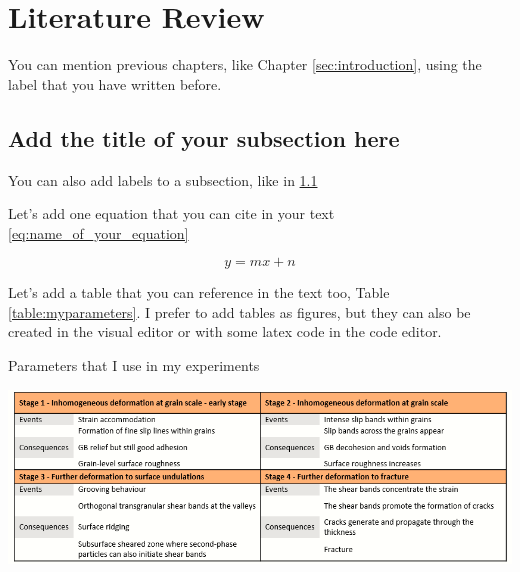 \section{Literature Review}
\label{sec:litreview}

You can mention previous chapters, like Chapter \ref{sec:introduction}, using the label that you have written before.

\subsection{\textbf{Add the title of your subsection here}}
\label{sec:labelname}

\vspace{0.1 in}
\noindent
You can also add labels to a subsection, like in \ref{sec:labelname}




\vspace{0.1 in}
\noindent


Let's add one equation that you can cite in your text \ref{eq:name_of_your_equation}

\vspace{0.1 in}
\noindent

\begin{equation}
\label{eq:name_of_your_equation}
y = mx + n
\end{equation}


\vspace{0.1 in}
\noindent

Let's add a table that you can reference in the text too, Table \ref{table:myparameters}. I prefer to add tables as figures, but they can also be created in the visual editor or with some latex code in the code editor.

\begin{table}[H] %
    \centering
    \caption{Parameters that I use in my experiments}
    \label{table:myparameters}    
    \includegraphics[width=6in]{Figures/LitRev/Stages_table_title.png}
\end{table}

